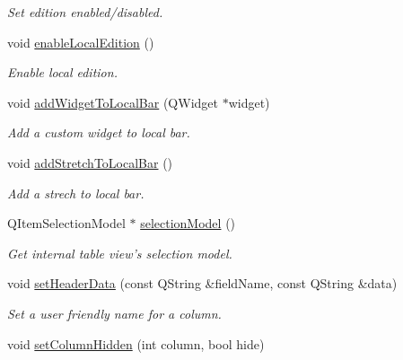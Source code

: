 \begin{DoxyCompactItemize}
\begin{DoxyCompactList}\small\item\em Set edition enabled/disabled. \end{DoxyCompactList}\item 
void \hyperlink{classmdt_sql_table_widget_a39422fb9522ee73513f13d8bcb91a143}{enableLocalEdition} ()
\begin{DoxyCompactList}\small\item\em Enable local edition. \end{DoxyCompactList}\item 
void \hyperlink{classmdt_sql_table_widget_a9c0ae7b87d1840f2fdcee6de763fe31a}{addWidgetToLocalBar} (QWidget $\ast$widget)
\begin{DoxyCompactList}\small\item\em Add a custom widget to local bar. \end{DoxyCompactList}\item 
\hypertarget{classmdt_sql_table_widget_a6cf9f08b98dd3df16d36c29db7175633}{
void \hyperlink{classmdt_sql_table_widget_a6cf9f08b98dd3df16d36c29db7175633}{addStretchToLocalBar} ()}
\label{classmdt_sql_table_widget_a6cf9f08b98dd3df16d36c29db7175633}

\begin{DoxyCompactList}\small\item\em Add a strech to local bar. \end{DoxyCompactList}\item 
\hypertarget{classmdt_sql_table_widget_a47fc691f2cd9cc40749c987ce2bbea6d}{
QItemSelectionModel $\ast$ \hyperlink{classmdt_sql_table_widget_a47fc691f2cd9cc40749c987ce2bbea6d}{selectionModel} ()}
\label{classmdt_sql_table_widget_a47fc691f2cd9cc40749c987ce2bbea6d}

\begin{DoxyCompactList}\small\item\em Get internal table view's selection model. \end{DoxyCompactList}\item 
void \hyperlink{classmdt_sql_table_widget_a591461ee19f22008a5c310609461081e}{setHeaderData} (const QString \&fieldName, const QString \&data)
\begin{DoxyCompactList}\small\item\em Set a user friendly name for a column. \end{DoxyCompactList}\item 
\hypertarget{classmdt_sql_table_widget_a466ff75bee2a0efd99c62994f65a5d18}{
void \hyperlink{classmdt_sql_table_widget_a466ff75bee2a0efd99c62994f65a5d18}{setColumnHidden} (int column, bool hide)}
\label{classmdt_sql_table_widget_a466ff75bee2a0efd99c62994f65a5d18}


\end{DoxyCompactItemize}
